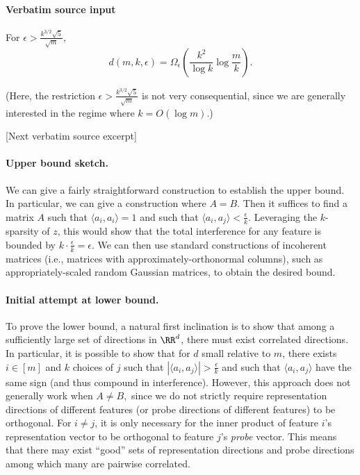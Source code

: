 \documentclass[10pt]{article}
\begin{document}
\paragraph{Verbatim source input}
\begin{ReviewVerbatim}
\begin{theorem}\label{thm:lower}
For $\epsilon > \frac{k^{3/2}\sqrt{5}}{\sqrt{m}},$
    \begin{equation}
        d(m,k,\epsilon) = \Omega_\epsilon\left(\frac{k^2}{\log k}\log \frac{m}{k}\right).
    \end{equation}
\end{theorem}

(Here, the restriction $\epsilon > \frac{k^{3/2}\sqrt{5}}{\sqrt{m}}$ is not very consequential, since we are generally interested in the regime where $k = O(\log m).$)

[Next verbatim source excerpt]

\paragraph{Upper bound sketch.} We can give a fairly straightforward construction to establish the upper bound. In particular, we can give a construction where $A=B$. Then it suffices to find a matrix $A$ such that $\langle a_i, a_i\rangle = 1$ and such that $\langle a_i, a_j\rangle < \frac{\epsilon}{k}.$ Leveraging the $k$-sparsity of $z$, this would show that the total interference for any feature is bounded by $k \cdot \frac{\epsilon}{k} = \epsilon$. We can then use standard constructions of incoherent matrices (i.e., matrices with approximately-orthonormal columns), such as appropriately-scaled random Gaussian matrices, to obtain the desired bound.

\paragraph{Initial attempt at lower bound.}
To prove the lower bound, a natural first inclination is to show that among a sufficiently large set of directions in $\RR^d$, there must exist correlated directions. In particular, it is possible to show that for $d$ small relative to $m$, there exists $i\in [m]$ and $k$ choices of $j$ such that $|\langle a_i,a_j\rangle| > \frac{\epsilon}{k}$ and such that $\langle a_i,a_j\rangle$ have the same sign (and thus compound in interference). However, this approach does not generally work when $A\neq B,$ since we do not strictly require representation directions of different features (or probe directions of different features) to be orthogonal. For $i\neq j$, it is only necessary for the inner product of feature $i$'s representation vector to be orthogonal to feature $j$'s \textit{probe} vector. This means that there may exist ``good'' sets of representation directions and probe directions among which many are pairwise correlated.


\end{ReviewVerbatim}
\end{document}
